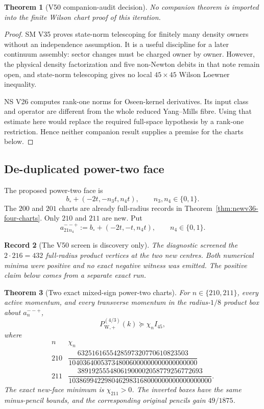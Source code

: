 \documentclass[11pt,oneside]{article}
\newtheorem{theorem}{Theorem}[section]
\newtheorem{record}[theorem]{Record}
\theoremstyle{definition}
\theoremstyle{remark}
\begin{document}
\begin{theorem}[V50 companion-audit decision]
\label{thm:newv50-audit-decision}
No companion theorem is imported into the finite Wilson chart
proof of this iteration.
\end{theorem}

\begin{proof}
SM V35 proves state-norm telescoping for finitely many density
owners without an independence assumption.  It is a useful
discipline for a later continuum assembly: sector changes must be
charged owner by owner.  However, the physical density
factorization and five non-Newton debits in that note remain open,
and state-norm telescoping gives no local \(45\times45\) Wilson
Loewner inequality.

NS V26 computes rank-one norms for Oseen-kernel derivatives.  Its
input class and operator are different from the whole reduced
Yang--Mills fibre.  Using that estimate here would replace the
required full-space hypothesis by a rank-one restriction.  Hence
neither companion result supplies a premise for the charts below.
\end{proof}

\subsection{De-duplicated power-two face}

The proposed power-two face is
\[
 b_\circ+(-2t,-n_3t,n_4t),\qquad n_3,n_4\in\{0,1\}.   \tag{50.3}
\]
The \(200\) and \(201\) charts are already full-radius records in
Theorem~\ref{thm:newv36-four-charts}.  Only \(210\) and \(211\)
are new.  Put
\[
 a_{21n_4}^{--+}:=b_\circ+(-2t,-t,n_4t),
 \qquad n_4\in\{0,1\}.                                \tag{50.4}
\]

\begin{record}[The V50 screen is discovery only]
\label{rec:newv50-screen}
The diagnostic screened the \(2\cdot216=432\) full-radius product
vertices at the two new centres.  Both numerical minima were
positive and no exact negative witness was emitted.  The positive
claim below comes from a separate exact run.
\end{record}

\begin{theorem}[Two exact mixed-sign power-two charts]
\label{thm:newv50-two-charts}
For \(n\in\{210,211\}\), every active momentum, and every transverse
momentum in the radius-\(1/8\) product box about \(a_n^{--+}\),
\[
 P_{\mathrm W,+}^{(4/3)}(k)\succeq\chi_n I_{45},      \tag{50.5}
\]
where
\[
\begin{array}{c|c}
n&\chi_n\\ \hline
210&\dfrac{6325161655428597320770610823503}
{104036400537348006000000000000000000}\\[5pt]
211&\dfrac{38919255548061900002058779256772693}
{1038699422980462983168000000000000000000}.
\end{array}                                             \tag{50.6}
\]
The exact new-face minimum is \(\chi_{211}>0\).  The inverted boxes
have the same minus-pencil bounds, and the corresponding original
pencils gain \(49/1875\).
\end{theorem}
\end{document}
